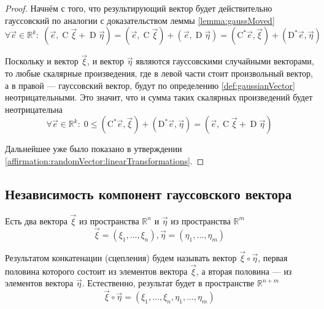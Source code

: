 \begin{proof}
    Начнём с того, что результирующий вектор будет действительно гауссовский по
    аналогии с доказательством леммы \ref{lemma:gaussMoved}
    $$\forall \vec{e} \in \mathbb{R}^k:\;
        \left( \vec{e}, \operatorname{C} \vec{\xi} + \operatorname{D} \vec{\eta}
                \right)
            = \left( \vec{e}, \operatorname{C} \vec{\xi} \right)
                + \left( \vec{e}, \operatorname{D} \vec{\eta} \right)
            = \left( \operatorname{C^*} \vec{e}, \vec{\xi} \right)
                + \left( \operatorname{D^*} \vec{e}, \vec{\eta} \right)$$

    Поскольку и вектор $\vec{\xi}$, и вектор $\vec{\eta}$ являются гауссовскими
    случайными векторами, то любые скалярные произведения, где в левой части
    стоит произвольный вектор, а в правой --- гауссовский вектор, будут по
    определению \ref{def:gaussianVector} неотрицательными. Это значит, что и
    сумма таких скалярных произведений будет неотрицательна
    $$\forall \vec{e} \in \mathbb{R}^k:\;
        0 \le \left( \operatorname{C^*} \vec{e}, \vec{\xi} \right)
                + \left( \operatorname{D^*} \vec{e}, \vec{\eta} \right)
        = \left( \vec{e}, \operatorname{C} \vec{\xi}
                + \operatorname{D} \vec{\eta} \right)$$

    Дальнейшее уже было показано в утверждении
    \ref{affirmation:randomVector:linearTransformations}.
\end{proof}

\subsection{Независимость компонент гауссовского вектора}

\begin{definition}
    Есть два вектора $\vec{\xi}$ из пространства $\mathbb{R}^n$ и $\vec{\eta}$
    из пространства $\mathbb{R}^m$
    $$\vec{\xi} = \left( \xi_1, \dots, \xi_n \right),
        \vec{\eta} = \left( \eta_1, \dots, \eta_m \right)$$

    Результатом конкатенации (сцепления) будем называть вектор
    $\vec{\xi} \circ \vec{\eta}$, первая половина которого состоит из
    элементов вектора $\vec{\xi}$, а вторая половина --- из элементов вектора
    $\vec{\eta}$. Естественно, результат будет в пространстве $\mathbb{R}^{n+m}$
    $$\vec{\xi} \circ \vec{\eta}
        = \left( \xi_1, \dots, \xi_n, \eta_1, \dots, \eta_m \right)$$
\end{definition}

